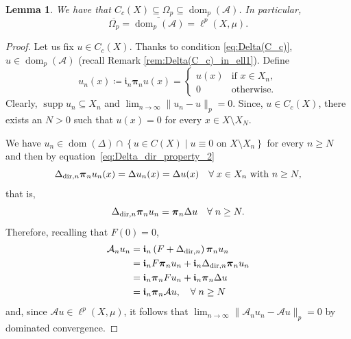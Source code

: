 \documentclass[journal]{article}
\theoremstyle{nonitalic}
\theoremstyle{nonitalic}
\theoremstyle{plain} %
\newtheorem{lemma}[theorem]{Lemma}
\numberwithin{equation}{section}
\newcommand{\dom}{\operatorname{dom}}
\newcommand{\Deltadirn}{\Delta_{\textnormal{dir},n}}
\newcommand{\Amin}{\mathcal{A}_{n}}
\begin{document}
\begin{lemma}\label{cor:FC}
We have that $C_c(X) \subseteq \Omega_p \subseteq \dom_p(\mathcal{A})$. In particular, $$\overline{\Omega_p}= \overline{\dom_p(\mathcal{A})}=\ell^p(X,\mu).$$	 
\end{lemma}
\begin{proof}
Let us fix $u \in C_c(X)$. Thanks to condition \eqref{eq:Delta(C_c)}, $u\in \dom_p(\mathcal{A})$ (recall Remark \ref{rem:Delta(C_c)_in_ell1}). Define 
	$$
	u_n(x)\coloneqq \boldsymbol{\mathfrak{i}}_{n}\boldsymbol{\pi}_n u(x)= \begin{cases}
		u(x) & \mbox{if } x \in X_n,\\
		0 &\mbox{otherwise}.
	\end{cases}
	$$
	Clearly, $\operatorname{supp}u_n \subseteq X_n$ and $\lim_{n\to \infty}\|u_n -u \|_p=0$. Since, $u\in C_c(X)$, there exists an $N>0$ such that $u(x)=0$ for every $x\in X\setminus X_N$.  
	
	We have  $u_n\in \dom\left(\Delta\right)\cap \left\{u \in C(X) \mid u \equiv 0 \mbox{ on } X\setminus X_n \right\}$
    for every $n\geq N$ and then by equation~\eqref{eq:Delta_dir_property_2}
	\begin{equation*}
		\Deltadirn \boldsymbol{\pi}_n  u_n (x) =  \Delta u_n (x) =  \Delta u (x) \quad \forall\; x\in X_n \text{ with } n\geq N,
	\end{equation*}
	that is,
	\begin{equation*}
		\Deltadirn \boldsymbol{\pi}_n  u_n = \boldsymbol{\pi}_n\Delta  u \quad \forall\; n\geq N.
	\end{equation*}
	Therefore, recalling that $F(0)=0$,
	\begin{align*}
		\Amin u_n &= \boldsymbol{\mathfrak{i}}_{n}\left( F + \Deltadirn \right) \boldsymbol{\pi}_n u_n\\
        &= \boldsymbol{\mathfrak{i}}_{n} F \boldsymbol{\pi}_n u_n  + \boldsymbol{\mathfrak{i}}_{n}\Deltadirn \boldsymbol{\pi}_n   u_n\\
        &= \boldsymbol{\mathfrak{i}}_{n}\boldsymbol{\pi}_n F  u_n  + \boldsymbol{\mathfrak{i}}_{n}\boldsymbol{\pi}_n\Delta  u \\
        &= \boldsymbol{\mathfrak{i}}_{n}\boldsymbol{\pi}_n\mathcal{A} u, \quad \forall\; n\geq N
	\end{align*}
	and, since $\mathcal{A}u \in \ell^p(X,\mu)$, it follows that $\lim_{n\to \infty}\| \Amin u_n - \mathcal{A} u\|_p=0$
	by dominated convergence.
\end{proof}
\end{document}

